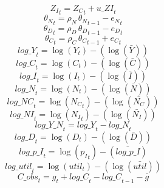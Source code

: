 \begin{dmath}
{{Z_I}}_{t}={{Z_C}}_{t}+{u\_ZI}_{t}
\end{dmath}
\begin{dmath}
{{\theta_N}}_{t}={{\rho_N}}\, {{\theta_N}}_{t-1}-{{e_N}}_{t}
\end{dmath}
\begin{dmath}
{{\theta_D}}_{t}={{\rho_D}}\, {{\theta_D}}_{t-1}-{{e_D}}_{t}
\end{dmath}
\begin{dmath}
{{\theta_C}}_{t}={{\rho_C}}\, {{\theta_C}}_{t-1}+{{e_C}}_{t}
\end{dmath}
\begin{dmath}
{log\_Y}_{t}=\log\left({{Y}}_{t}\right)-(\log\left(\bar{{Y}}\right))
\end{dmath}
\begin{dmath}
{log\_C}_{t}=\log\left({{C}}_{t}\right)-(\log\left(\bar{{C}}\right))
\end{dmath}
\begin{dmath}
{log\_I}_{t}=\log\left({{I}}_{t}\right)-(\log\left(\bar{{I}}\right))
\end{dmath}
\begin{dmath}
{log\_N}_{t}=\log\left({{N}}_{t}\right)-(\log\left(\bar{{N}}\right))
\end{dmath}
\begin{dmath}
{log\_NC}_{t}=\log\left({{N_C}}_{t}\right)-(\log\left(\bar{{N_C}}\right))
\end{dmath}
\begin{dmath}
{log\_NI}_{t}=\log\left({{N_I}}_{t}\right)-(\log\left(\bar{{N_I}}\right))
\end{dmath}
\begin{dmath}
{log\_Y\_N}_{t}={log\_Y}_{t}-{log\_N}_{t}
\end{dmath}
\begin{dmath}
{log\_D}_{t}=\log\left({{D}}_{t}\right)-(\log\left(\bar{{D}}\right))
\end{dmath}
\begin{dmath}
{log\_p\_I}_{t}=\log\left({{p_I}}_{t}\right)-(\bar{log\_p\_I})
\end{dmath}
\begin{dmath}
{log\_util}_{t}=\log\left({{util}}_{t}\right)-(\log\left(\bar{{util}}\right))
\end{dmath}
\begin{dmath}
{C\_obs}_{t}={{g}}_{t}+{log\_C}_{t}-{log\_C}_{t-1}-{{\overline{g}}}
\end{dmath}
